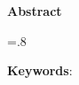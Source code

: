 

\begin{latin}

\begin{center}
\textbf{Abstract}
\end{center}
\baselineskip=.8\baselineskip

\bigskip\noindent\textbf{Keywords}:

\end{latin}
